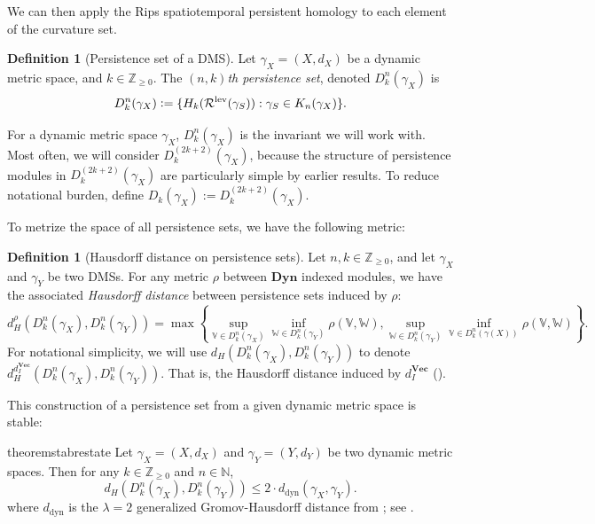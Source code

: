\documentclass[a4paper,UKenglish,thm-restate]{article}
\theoremstyle{definition}
\newtheorem{definition}[theorem]{Definition}
\def\bbv{\mathbb{V}}
\def\bbw{\mathbb{W}}
\def\bdyn{\mathbf{Dyn}}
\def\bvec{\mathbf{Vec}}
\newcommand{\defeq}{\vcentcolon=}
\begin{document}
    We can then apply the Rips spatiotemporal persistent homology to each element of the curvature set. 
    \begin{definition}[Persistence set of a DMS]\label{def:dyncurvpmod}
        Let $\gamma_X = (X, d_X)$ be a dynamic metric space, and $k \in \mathbb{Z}_{\geq 0}$. The \emph{$(n, k)$th persistence set}, denoted $D_k^n(\gamma_X)$ is
        \[D_k^n(\gamma_X) \defeq \{ H_k(\mathcal{R}^{\mathrm{lev}}(\gamma_S)) : \gamma_S \in K_{n}(\gamma_X) \}.\]
    \end{definition}

    For a dynamic metric space $\gamma_X$, $D_k^n(\gamma_X)$ is the invariant we will work with. Most often, we will consider $D_k^{(2k+2)}(\gamma_X)$, because the structure of persistence modules in $D_k^{(2k+2)}(\gamma_X)$ are particularly simple by earlier results. To reduce notational burden, define $D_k(\gamma_X) := D_k^{(2k+2)}(\gamma_X)$.

    To metrize the space of all persistence sets, we have the following metric:
    \begin{definition}[Hausdorff distance on persistence sets] \label{def:persistencesetmetric}
        Let $n, k \in \mathbb{Z}_{\geq 0}$, and let $\gamma_X$ and $\gamma_Y$ be two DMSs. For any metric $\rho$ between $\bdyn$ indexed modules, we have the associated \emph{Hausdorff distance} between persistence sets induced by $\rho$:
        \[d^{\rho}_H(D_k^n(\gamma_X), D_k^n(\gamma_Y)) = \max \left\{ \sup_{\bbv \in D_k^n(\gamma_X)} \inf_{\bbw \in D_k^n(\gamma_Y)} \rho(\bbv, \bbw), \sup_{\bbw \in D_k^n(\gamma_Y)} \inf_{\bbv \in D_k^n(\gamma(X))} \rho(\bbv, \bbw) \right\}.\]
        For notational simplicity, we will use $d_H(D_k^n(\gamma_X), D_k^n(\gamma_Y))$ to denote $d^{d_I^{\bvec}}_H(D_k^n(\gamma_X), D_k^n(\gamma_Y))$. That is, the Hausdorff distance induced by $d_I^{\bvec}$ ().
    \end{definition}

    This construction of a persistence set from a given dynamic metric space is stable:
    \begin{restatable}{theorem}{stabrestate}\label{thm:stability}
        Let $\gamma_X = (X, d_X)$ and $\gamma_Y = (Y, d_Y)$ be two dynamic metric spaces. Then for any $k \in \mathbb{Z}_{\geq 0}$ and $n \in \mathbb{N}$, \[d_H\left(D_k^n(\gamma_X), D_k^n(\gamma_Y)\right) \leq 2 \cdot d_{\text{dyn}}(\gamma_X, \gamma_Y).\]
        where $d_{\text{dyn}}$ is the $\lambda=2$ generalized Gromov-Hausdorff distance from \cite{stablesignatures}; see .
    \end{restatable}
\end{document}
